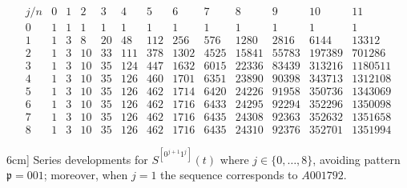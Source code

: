 \begin{table}
\begin{equation*}
\begin{array}{c|cccccccccccc}
    j/n & 0 & 1 & 2 & 3 & 4 & 5 & 6 & 7 & 8 & 9 & 10 & 11\\\hline0 & 1 & 1 & 1 & 1 & 1 & 1 & 1 & 1 & 1 & 1 & 1 & 1\\1 & 1 & 3 & 8 & 20 & 48 & 112 & 256 & 576 & 1280 & 2816 & 6144 & 13312\\2 & 1 & 3 & 10 & 33 & 111 & 378 & 1302 & 4525 & 15841 & 55783 & 197389 & 701286\\3 & 1 & 3 & 10 & 35 & 124 & 447 & 1632 & 6015 & 22336 & 83439 & 313216 & 1180511\\4 & 1 & 3 & 10 & 35 & 126 & 460 & 1701 & 6351 & 23890 & 90398 & 343713 & 1312108\\5 & 1 & 3 & 10 & 35 & 126 & 462 & 1714 & 6420 & 24226 & 91958 & 350736 & 1343069\\6 & 1 & 3 & 10 & 35 & 126 & 462 & 1716 & 6433 & 24295 & 92294 & 352296 & 1350098\\7 & 1 & 3 & 10 & 35 & 126 & 462 & 1716 & 6435 & 24308 & 92363 & 352632 & 1351658\\8 & 1 & 3 & 10 & 35 & 126 & 462 & 1716 & 6435 & 24310 & 92376 & 352701 & 1351994
\end{array}
\end{equation*}
\caption[Series developments for $S^{[0^{j+1}1^j]}(t)$ where $j\in \lbrace 0,\ldots,8 \rbrace$.]
        [6cm]{
            Series developments for $S^{[0^{j+1}1^j]}(t)$ where $j\in \lbrace 0,\ldots,8 \rbrace$,
            avoiding pattern $\mathfrak{p}=001$; moreover,
            when $j=1$ the sequence corresponds to $A001792$.
        }
\label{tbl:S0_j1:1_j}
\end{table}

